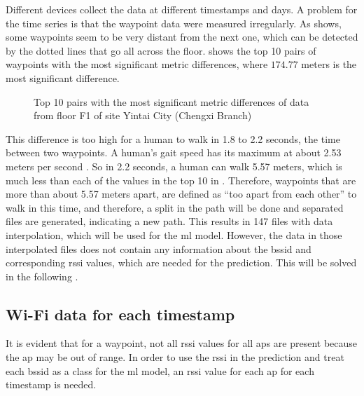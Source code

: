 Different devices collect the data at different timestamps and days.
A problem for the time series is that the waypoint data were measured irregularly.
As  shows, some waypoints seem to be very distant from the next one, which can be detected by the dotted lines that go all across the floor.
 shows the top 10 pairs of waypoints with the most significant metric differences, where \(174.77\) meters is the most significant difference.

\begin{figure}[h]
    \centering
    \caption{Top 10 pairs with the most significant metric differences of data from floor F1 of site Yintai City (Chengxi Branch)}

    
    \label{tab:metric-diff}
\end{figure}

This difference is too high for a human to walk in 1.8 to 2.2 seconds, the time between two waypoints.
A human's gait speed has its maximum at about 2.53 meters per second \cite{bohannonComfortableMaximumWalking1997}.
So in 2.2 seconds, a human can walk 5.57 meters, which is much less than each of the values in the top 10 in .
Therefore, waypoints that are more than about 5.57 meters apart, are defined as ``too apart from each other'' to walk in this time, and therefore, a split in the path will be done and separated files are generated, indicating a new path.
This results in 147 files with data interpolation, which will be used for the \ac{ml} model.
However, the data in those interpolated files does not contain any information about the \ac{bssid} and corresponding \ac{rssi} values, which are needed for the prediction.
This will be solved in the following .


\subsection{Wi-Fi data for each timestamp}\label{sec:wifi-data}
It is evident that for a waypoint, not all \ac{rssi} values for all \acp{ap} are present because the \ac{ap} may be out of range.
In order to use the \ac{rssi} in the prediction and treat each \ac{bssid} as a class for the \ac{ml} model, an \ac{rssi} value for each \ac{ap} for each timestamp is needed.

